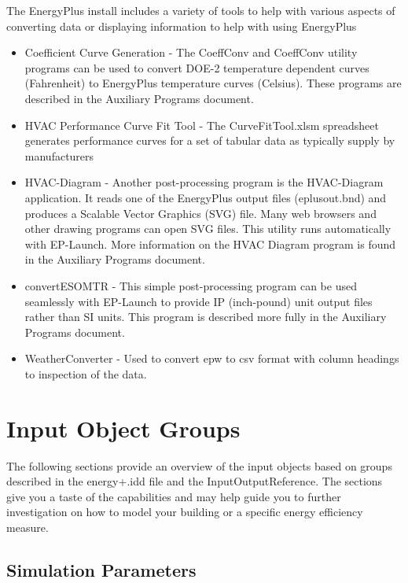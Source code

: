 The EnergyPlus install includes a variety of tools to help with various
aspects of converting data or displaying information to help with
using EnergyPlus
\begin{itemize}
\item Coefficient Curve Generation - The CoeffConv and CoeffConv utility
programs can be used to convert DOE-2 temperature dependent curves
(Fahrenheit) to EnergyPlus temperature curves (Celsius). These programs
are described in the Auxiliary Programs document.
\item HVAC Performance Curve Fit Tool - The CurveFitTool.xlsm spreadsheet
generates performance curves for a set of tabular data as typically
supply by manufacturers
\item HVAC-Diagram - Another post-processing program is the HVAC-Diagram
application. It reads one of the EnergyPlus output files (eplusout.bnd)
and produces a Scalable Vector Graphics (SVG) file. Many web browsers
and other drawing programs can open SVG files. This utility runs automatically
with EP-Launch. More information on the HVAC Diagram program is found
in the Auxiliary Programs document. 
\item convertESOMTR - This simple post-processing program can be used seamlessly
with EP-Launch to provide IP (inch-pound) unit output files rather
than SI units. This program is described more fully in the Auxiliary
Programs document.
\item WeatherConverter - Used to convert epw to csv format with column headings
to inspection of the data.
\end{itemize}

\chapter{Input Object Groups}

The following sections provide an overview of the input objects based
on groups described in the energy+.idd file and the InputOutputReference.
The sections give you a taste of the capabilities and may help guide
you to further investigation on how to model your building or a specific
energy efficiency measure.

\section{Simulation Parameters}

